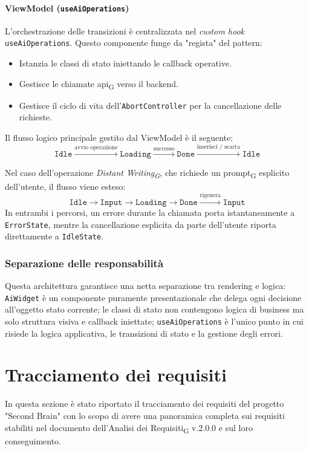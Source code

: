 \documentclass[11pt,a4paper]{article}
\newcommand{\gls}[1]{#1\textsubscript{G}}
\begin{document}
\paragraph{ViewModel (\texttt{useAiOperations})}
L'orchestrazione delle transizioni è centralizzata nel \textit{custom hook} \texttt{useAiOperations}. Questo componente funge da "regista" del pattern:
\begin{itemize}
    \item Istanzia le classi di stato iniettando le callback operative.
    \item Gestisce le chiamate \gls{api} verso il backend.
    \item Gestisce il ciclo di vita dell'\texttt{AbortController} per la cancellazione delle richieste.
\end{itemize}

Il flusso logico principale gestito dal ViewModel è il seguente:
\begin{equation*}
\texttt{Idle} \xrightarrow{\text{avvio operazione}} \texttt{Loading} \xrightarrow{\text{successo}} \texttt{Done} \xrightarrow{\text{inserisci / scarta}} \texttt{Idle}
\end{equation*}

Nel caso dell'operazione \textit{\gls{Distant Writing}}, che richiede un \gls{prompt} esplicito dell'utente, il flusso viene esteso:
\begin{equation*}
\texttt{Idle} \to \texttt{Input} \to \texttt{Loading} \to \texttt{Done} \xrightarrow{\text{rigenera}} \texttt{Input}
\end{equation*}
In entrambi i percorsi, un errore durante la chiamata porta istantaneamente a \texttt{ErrorState}, mentre la cancellazione esplicita da parte dell'utente riporta direttamente a \texttt{IdleState}.

\subsubsection{Separazione delle responsabilità}
Questa architettura garantisce una netta separazione tra rendering e logica: \texttt{AiWidget} è un componente puramente presentazionale che delega ogni decisione all'oggetto stato corrente; le classi di stato non contengono logica di business ma solo struttura visiva e callback iniettate; \texttt{useAiOperations} è l'unico punto in cui risiede la logica applicativa, le transizioni di stato e la gestione degli errori.


\newpage

\section{Tracciamento dei requisiti}
In questa sezione è stato riportato il tracciamento dei requisiti del progetto "Second Brain" con lo scopo di avere una panoramica completa sui requisiti stabiliti nel documento dell'\gls{Analisi dei Requisiti} v.2.0.0 e sul loro conseguimento.
\end{document}
